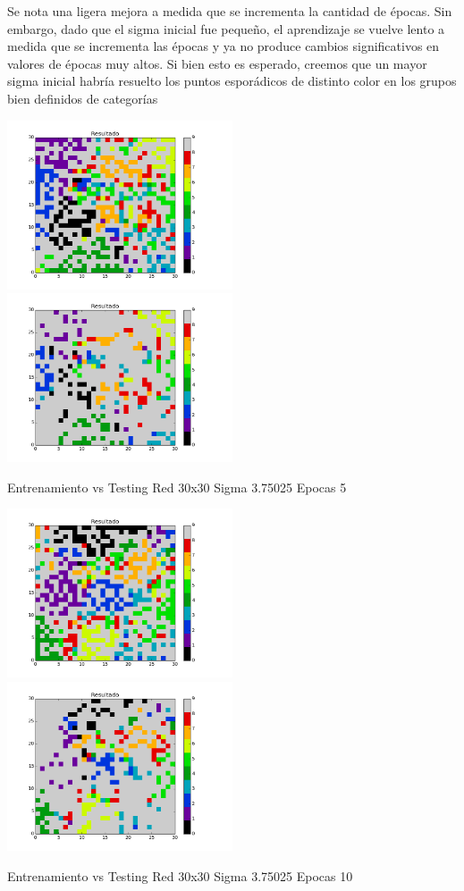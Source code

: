 Se nota una ligera mejora a medida que se incrementa la cantidad de \'epocas. Sin embargo, dado que el sigma inicial fue pequeño, el aprendizaje se vuelve lento a medida que se incrementa las \'epocas y ya no produce cambios significativos en valores de \'epocas muy altos. Si bien esto es esperado, creemos que un mayor sigma inicial habr\'ia resuelto los puntos espor\'adicos de distinto color en los grupos bien definidos de categor\'ias

\includegraphics[width=0.5\textwidth]{img/Ej2_Epocas/train_M_30_sigma_3_75025_epocas_5}
\includegraphics[width=0.5\textwidth]{img/Ej2_Epocas/test_M_30_sigma_3_75025_epocas_5}
{\center \footnotesize Entrenamiento vs Testing Red 30x30 Sigma 3.75025 Epocas 5\par}

\includegraphics[width=0.5\textwidth]{img/Ej2_Epocas/train_M_30_sigma_3_75025_epocas_10}
\includegraphics[width=0.5\textwidth]{img/Ej2_Epocas/test_M_30_sigma_3_75025_epocas_10}
{\center \footnotesize Entrenamiento vs Testing Red 30x30 Sigma 3.75025 Epocas 10\par}

